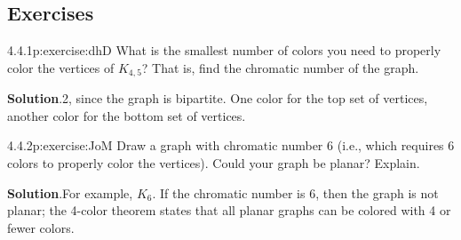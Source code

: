 \documentclass[twoside,11pt,]{book}
\newcommand{\blocktitlefont}{\relax}
\numberwithin{equation}{chapter}
\begin{document}
\subsection*{Exercises}
\begin{divisionsolution}{4.4.1}{}{p:exercise:dhD}%
What is the smallest number of colors you need to properly color the vertices of \(K_{4,5}\)? That is, find the chromatic number of the graph.%
\par\smallskip%
\noindent\textbf{\blocktitlefont Solution}.\quad{}2, since the graph is bipartite. One color for the top set of vertices, another color for the bottom set of vertices.%
\end{divisionsolution}%
\begin{divisionsolution}{4.4.2}{}{p:exercise:JoM}%
Draw a graph with chromatic number 6 (i.e., which requires 6 colors to properly color the vertices). Could your graph be planar? Explain.%
\par\smallskip%
\noindent\textbf{\blocktitlefont Solution}.\quad{}For example, \(K_6\). If the chromatic number is 6, then the graph is not planar; the 4-color theorem states that all planar graphs can be colored with 4 or fewer colors.%
\end{divisionsolution}%
\end{document}
